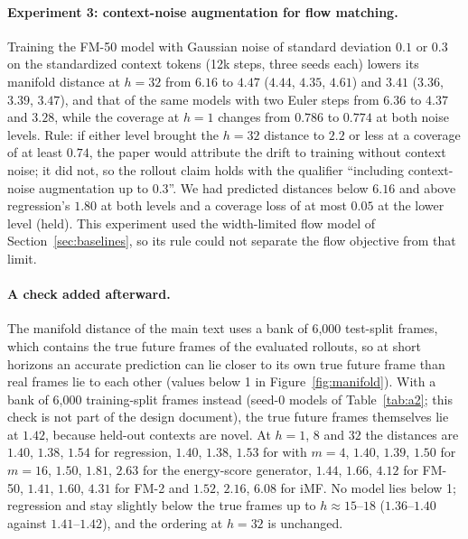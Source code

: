 \paragraph{Experiment 3: context-noise augmentation for flow matching.} Training the FM-50 model with Gaussian noise of standard deviation $0.1$ or $0.3$ on the standardized context tokens (12k steps, three seeds each) lowers its manifold distance at $h{=}32$ from $6.16$ to $4.47$ ($4.44$, $4.35$, $4.61$) and $3.41$ ($3.36$, $3.39$, $3.47$), and that of the same models with two Euler steps from $6.36$ to $4.37$ and $3.28$, while the coverage at $h{=}1$ changes from $0.786$ to $0.774$ at both noise levels. Rule: if either level brought the $h{=}32$ distance to $2.2$ or less at a coverage of at least $0.74$, the paper would attribute the drift to training without context noise; it did not, so the rollout claim holds with the qualifier ``including context-noise augmentation up to $0.3$''. We had predicted distances below $6.16$ and above regression's $1.80$ at both levels and a coverage loss of at most $0.05$ at the lower level (held). This experiment used the width-limited flow model of Section~\ref{sec:baselines}, so its rule could not separate the flow objective from that limit.

\paragraph{A check added afterward.} The manifold distance of the main text uses a bank of 6{,}000 test-split frames, which contains the true future frames of the evaluated rollouts, so at short horizons an accurate prediction can lie closer to its own true future frame than real frames lie to each other (values below 1 in Figure~\ref{fig:manifold}). With a bank of 6{,}000 training-split frames instead (seed-0 models of Table~\ref{tab:a2}; this check is not part of the design document), the true future frames themselves lie at $1.42$, because held-out contexts are novel. At $h = 1$, $8$ and $32$ the distances are $1.40$, $1.38$, $1.54$ for regression, $1.40$, $1.38$, $1.53$ for \imlewm{} with $m{=}4$, $1.40$, $1.39$, $1.50$ for $m{=}16$, $1.50$, $1.81$, $2.63$ for the energy-score generator, $1.44$, $1.66$, $4.12$ for FM-50, $1.41$, $1.60$, $4.31$ for FM-2 and $1.52$, $2.16$, $6.08$ for iMF. No model lies below 1; regression and \imlewm{} stay slightly below the true frames up to $h \approx 15$--$18$ ($1.36$--$1.40$ against $1.41$--$1.42$), and the ordering at $h{=}32$ is unchanged.

